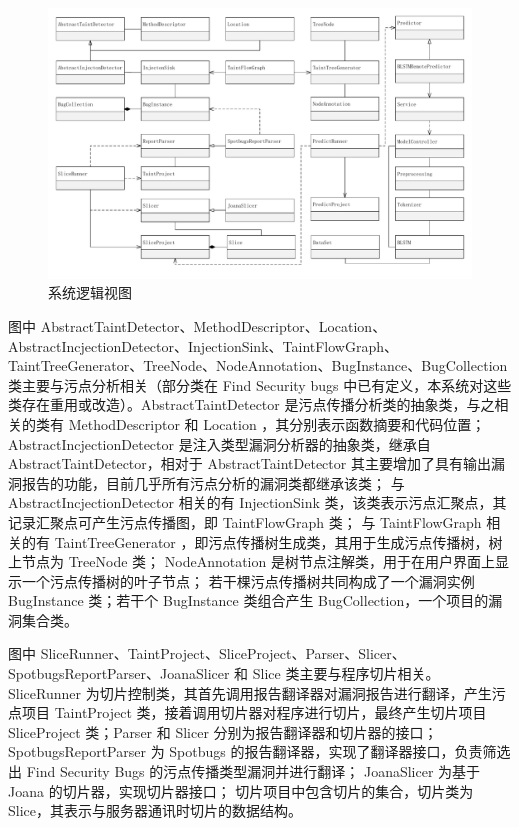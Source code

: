 \begin{figure}[!htbp]
    \centering
    \includegraphics[width=5in]{FIGs/chapter3/viewlogic.pdf}
    \caption{系统逻辑视图}\label{view:logic}
\end{figure}

图中 AbstractTaintDetector、MethodDescriptor、Location、AbstractIncjectionDetector、InjectionSink、TaintFlowGraph、TaintTreeGenerator、TreeNode、NodeAnnotation、BugInstance、BugCollection 类主要与污点分析相关（部分类在 Find Security bugs 中已有定义，本系统对这些类存在重用或改造）。AbstractTaintDetector 是污点传播分析类的抽象类，与之相关的类有 MethodDescriptor 和 Location ，其分别表示函数摘要和代码位置；
AbstractIncjectionDetector 是注入类型漏洞分析器的抽象类，继承自 AbstractTaintDetector，相对于 AbstractTaintDetector 其主要增加了具有输出漏洞报告的功能，目前几乎所有污点分析的漏洞类都继承该类；
与 AbstractIncjectionDetector 相关的有 InjectionSink 类，该类表示污点汇聚点，其记录汇聚点可产生污点传播图，即 TaintFlowGraph 类；
与 TaintFlowGraph 相关的有 TaintTreeGenerator ，即污点传播树生成类，其用于生成污点传播树，树上节点为 TreeNode 类；
NodeAnnotation 是树节点注解类，用于在用户界面上显示一个污点传播树的叶子节点；
若干棵污点传播树共同构成了一个漏洞实例 BugInstance 类；若干个 BugInstance 类组合产生 BugCollection，一个项目的漏洞集合类。

图中 SliceRunner、TaintProject、SliceProject、Parser、Slicer、SpotbugsReportParser、JoanaSlicer 和 Slice 类主要与程序切片相关。
SliceRunner 为切片控制类，其首先调用报告翻译器对漏洞报告进行翻译，产生污点项目 TaintProject 类，接着调用切片器对程序进行切片，最终产生切片项目 SliceProject 类；Parser 和 Slicer 分别为报告翻译器和切片器的接口；
SpotbugsReportParser 为 Spotbugs 的报告翻译器，实现了翻译器接口，负责筛选出 Find Security Bugs 的污点传播类型漏洞并进行翻译；
JoanaSlicer 为基于 Joana 的切片器，实现切片器接口；
切片项目中包含切片的集合，切片类为 Slice，其表示与服务器通讯时切片的数据结构。

